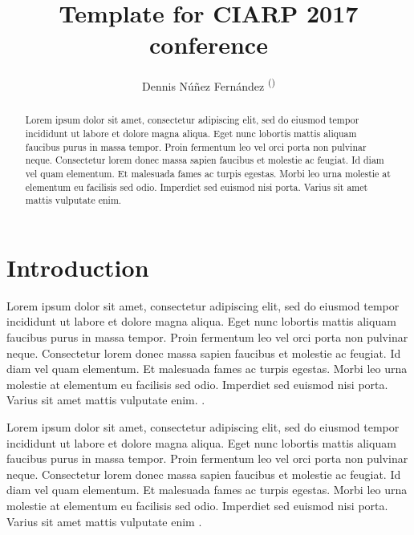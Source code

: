 \documentclass[runningheads]{llncs}
\begin{document}
%
\title{Template for CIARP 2017 conference}
%
%
\author{
Dennis N\'u\~nez Fern\'andez \textsuperscript{(\Letter)} 
}
%
%
%
\maketitle              %
%
\begin{abstract}
Lorem ipsum dolor sit amet, consectetur adipiscing elit, sed do eiusmod tempor incididunt ut labore et dolore magna aliqua. Eget nunc lobortis mattis aliquam faucibus purus in massa tempor. Proin fermentum leo vel orci porta non pulvinar neque. Consectetur lorem donec massa sapien faucibus et molestie ac feugiat. Id diam vel quam elementum. Et malesuada fames ac turpis egestas. Morbi leo urna molestie at elementum eu facilisis sed odio. Imperdiet sed euismod nisi porta. Varius sit amet mattis vulputate enim.

\end{abstract}
%
%
%


\section{Introduction}

Lorem ipsum dolor sit amet, consectetur adipiscing elit, sed do eiusmod tempor incididunt ut labore et dolore magna aliqua. Eget nunc lobortis mattis aliquam faucibus purus in massa tempor. Proin fermentum leo vel orci porta non pulvinar neque. Consectetur lorem donec massa sapien faucibus et molestie ac feugiat. Id diam vel quam elementum. Et malesuada fames ac turpis egestas. Morbi leo urna molestie at elementum eu facilisis sed odio. Imperdiet sed euismod nisi porta. Varius sit amet mattis vulputate enim. \cite{b1}.

Lorem ipsum dolor sit amet, consectetur adipiscing elit, sed do eiusmod tempor incididunt ut labore et dolore magna aliqua. Eget nunc lobortis mattis aliquam faucibus purus in massa tempor. Proin fermentum leo vel orci porta non pulvinar neque. Consectetur lorem donec massa sapien faucibus et molestie ac feugiat. Id diam vel quam elementum. Et malesuada fames ac turpis egestas. Morbi leo urna molestie at elementum eu facilisis sed odio. Imperdiet sed euismod nisi porta. Varius sit amet mattis vulputate enim \cite{b2} \cite{b3} \cite{b4} \cite{b5}.
\end{document}
